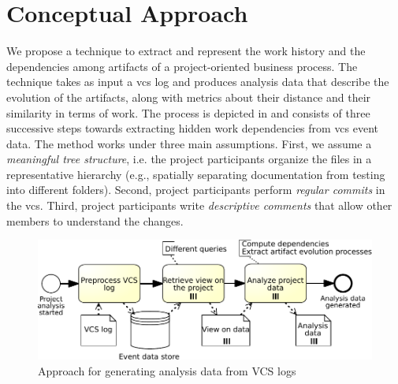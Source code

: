 \section{Conceptual Approach}
\label{sec:bpm2017approach}



We propose a technique to extract and represent the work history and the dependencies among artifacts of a project-oriented business process. The technique takes as input a \gls{vcs} log and produces analysis data that describe the evolution of the artifacts, along with metrics about their distance and their similarity in terms of work.
The process is depicted in  and consists of three successive steps towards extracting hidden work dependencies from \gls{vcs} event data. The method works under three main assumptions. First, we assume a \emph{meaningful tree structure}, i.e. the project participants organize the files in a representative hierarchy (e.g., spatially separating documentation from testing into different folders). Second, project participants perform \emph{regular commits} in the \gls{vcs}. Third, project participants write \emph{descriptive comments} that allow other members to understand the changes.

\begin{figure}[h]
	\centering
	\includegraphics[width=.7\textwidth]{bpm2017/figures/visualization-process-crop}
	\caption[Approach for generating analysis data from VCS logs]{Approach for generating analysis data from VCS logs}
	\label{fig:visualization-process}
\end{figure}

